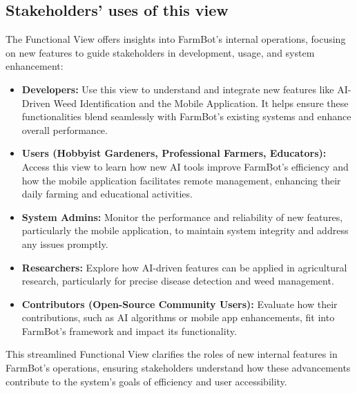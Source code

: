 \subsection{Stakeholders’ uses of this view}
The Functional View offers insights into FarmBot's internal operations, focusing on new features to guide stakeholders in development, usage, and system enhancement:
\begin{itemize}
    \item \textbf{Developers:} Use this view to understand and integrate new features like AI-Driven Weed Identification and the Mobile Application. It helps ensure these functionalities blend seamlessly with FarmBot's existing systems and enhance overall performance.
    \item \textbf{Users (Hobbyist Gardeners, Professional Farmers, Educators):} Access this view to learn how new AI tools improve FarmBot’s efficiency and how the mobile application facilitates remote management, enhancing their daily farming and educational activities.
    \item \textbf{System Admins:} Monitor the performance and reliability of new features, particularly the mobile application, to maintain system integrity and address any issues promptly.
    \item \textbf{Researchers:} Explore how AI-driven features can be applied in agricultural research, particularly for precise disease detection and weed management.
    \item \textbf{Contributors (Open-Source Community Users):} Evaluate how their contributions, such as AI algorithms or mobile app enhancements, fit into FarmBot’s framework and impact its functionality.
\end{itemize}
This streamlined Functional View clarifies the roles of new internal features in FarmBot’s operations, ensuring stakeholders understand how these advancements contribute to the system’s goals of efficiency and user accessibility.

\newpage
